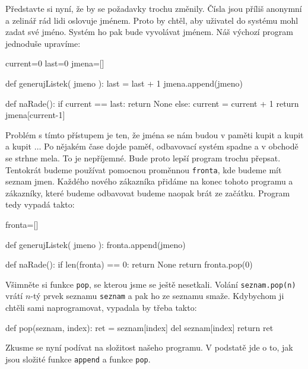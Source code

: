 Představte si nyní, že by se požadavky trochu změnily. Čísla jsou příliš anonymní a zelinář rád lidi oslovuje jménem. Proto by chtěl,
aby uživatel do systému mohl zadat své jméno. Systém ho pak bude vyvolávat jménem. Náš výchozí program jednoduše upravíme:

\begin{python}
current=0
last=0
jmena=[]

def generujListek( jmeno ):
    last = last + 1
    jmena.append(jmeno)
    
def naRade():
    if current == last:
        return None
    else:
        current = current + 1
    return jmena[current-1]
\end{python}

Problém s tímto přístupem je ten, že jména se nám budou v paměti kupit a kupit a kupit $\ldots$ Po nějakém čase dojde paměť, odbavovací systém spadne a 
v obchodě se strhne mela. To je nepříjemné. Bude proto lepší program trochu přepsat. Tentokrát budeme používat pomocnou proměnnou {\tt fronta}, kde
budeme mít seznam jmen. Každého nového zákazníka přidáme na konec tohoto programu a zákazníky, které budeme odbavovat budeme naopak brát ze začátku.
Program tedy vypadá takto:

\begin{python}
fronta=[]

def generujListek( jmeno ):
    fronta.append(jmeno)
    
def naRade():
    if len(fronta) == 0:
        return None
    return fronta.pop(0)
\end{python}

Všimněte si funkce {\tt pop}, se kterou jsme se ještě nesetkali. Volání {\tt seznam.pop(n)} vrátí $n$-tý prvek seznamu {\tt seznam}
a pak ho ze seznamu smaže. Kdybychom ji chtěli sami naprogramovat, vypadala by třeba takto:

\begin{python}
def pop(seznam, index):
    ret = seznam[index]
    del seznam[index]
    return ret
\end{python}

Zkusme se nyní podívat na složitost našeho programu. V podstatě jde o to, jak jsou složité funkce {\tt append} a funkce {\tt pop}.


